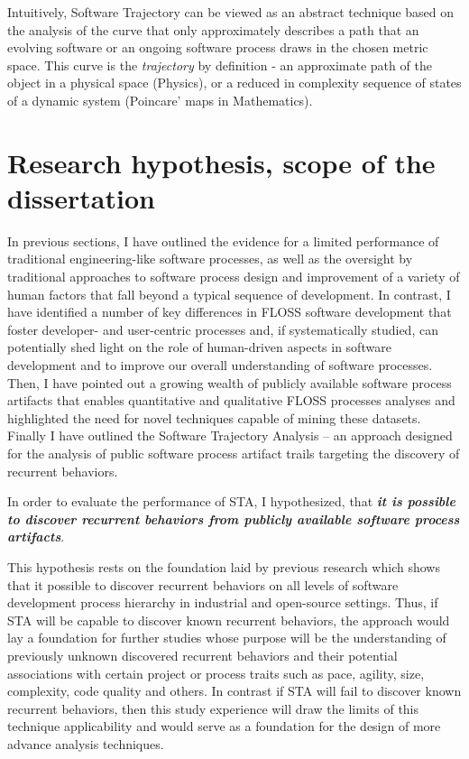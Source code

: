 Intuitively, Software Trajectory can be viewed as an abstract technique based on the analysis of the curve that only 
approximately describes a path that an evolving software or an ongoing software process draws in the chosen 
metric space. 
This curve is the \textit{trajectory} by definition - an approximate path of the object in a physical space (Physics), 
or a reduced in complexity sequence of states of a dynamic system (Poincare' maps in Mathematics). 

%
%
\section{Research hypothesis, scope of the dissertation}\label{section_research_hypothesis}
In previous sections, I have outlined the evidence for a limited performance of traditional engineering-like 
software processes, as well as the oversight by traditional approaches to software process design and improvement
of a variety of human factors that fall beyond a typical sequence of development.
In contrast, I have identified a number of key differences in FLOSS software development that foster developer- 
and user-centric processes and, if systematically studied, can potentially shed light on the role
of human-driven aspects in software development and to improve our overall understanding of software processes. 
Then, I have pointed out a growing wealth of publicly available software process artifacts that enables 
quantitative and qualitative FLOSS processes analyses
and highlighted the need for novel techniques capable of mining these datasets.
Finally I have outlined the Software Trajectory Analysis -- an approach designed for the analysis of public 
software process artifact trails targeting the discovery of recurrent behaviors.

In order to evaluate the performance of STA, I hypothesized, that 
\textbf{\textit{it is possible to discover recurrent behaviors from publicly available software process artifacts}}. 

This hypothesis rests on the foundation laid by previous research which shows that it possible to discover 
recurrent behaviors on all levels of software development process hierarchy \cite{citeulike:8347315} in 
industrial \cite{citeulike:5090131} and open-source \cite{citeulike:200721} settings. 
Thus, if STA will be capable to discover known recurrent behaviors, the approach would lay a foundation 
for further studies whose purpose will be the understanding of previously unknown discovered recurrent behaviors
and their potential associations with certain project or process traits such as pace, agility, size, complexity, 
code quality and others. 
In contrast if STA will fail to discover known recurrent behaviors, then this study experience will draw the limits 
of this technique applicability and would serve as a foundation for the design of more advance analysis techniques.

